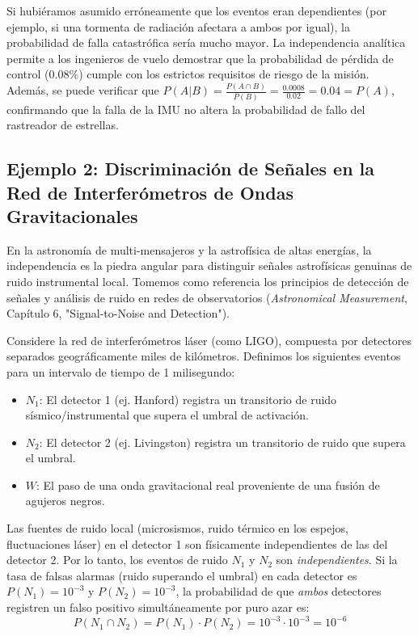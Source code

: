 Si hubiéramos asumido erróneamente que los eventos eran dependientes (por ejemplo, si una tormenta de radiación afectara a ambos por igual), la probabilidad de falla catastrófica sería mucho mayor. La independencia analítica permite a los ingenieros de vuelo demostrar que la probabilidad de pérdida de control ($0.08\%$) cumple con los estrictos requisitos de riesgo de la misión. Además, se puede verificar que $P(A|B) = \frac{P(A \cap B)}{P(B)} = \frac{0.0008}{0.02} = 0.04 = P(A)$, confirmando que la falla de la IMU no altera la probabilidad de fallo del rastreador de estrellas.

\subsection{Ejemplo 2: Discriminación de Señales en la Red de Interferómetros de Ondas Gravitacionales}

En la astronomía de multi-mensajeros y la astrofísica de altas energías, la independencia es la piedra angular para distinguir señales astrofísicas genuinas de ruido instrumental local. Tomemos como referencia los principios de detección de señales y análisis de ruido en redes de observatorios (\textit{Astronomical Measurement}, Capítulo 6, "Signal-to-Noise and Detection").

Considere la red de interferómetros láser (como LIGO), compuesta por detectores separados geográficamente miles de kilómetros. Definimos los siguientes eventos para un intervalo de tiempo de 1 milisegundo:
\begin{itemize}
    \item $N_1$: El detector 1 (ej. Hanford) registra un transitorio de ruido sísmico/instrumental que supera el umbral de activación.
    \item $N_2$: El detector 2 (ej. Livingston) registra un transitorio de ruido que supera el umbral.
    \item $W$: El paso de una onda gravitacional real proveniente de una fusión de agujeros negros.
\end{itemize}

Las fuentes de ruido local (microsismos, ruido térmico en los espejos, fluctuaciones láser) en el detector 1 son físicamente independientes de las del detector 2. Por lo tanto, los eventos de ruido $N_1$ y $N_2$ son \textit{independientes}. Si la tasa de falsas alarmas (ruido superando el umbral) en cada detector es $P(N_1) = 10^{-3}$ y $P(N_2) = 10^{-3}$, la probabilidad de que \textit{ambos} detectores registren un falso positivo simultáneamente por puro azar es:
$$ P(N_1 \cap N_2) = P(N_1) \cdot P(N_2) = 10^{-3} \cdot 10^{-3} = 10^{-6} $$


